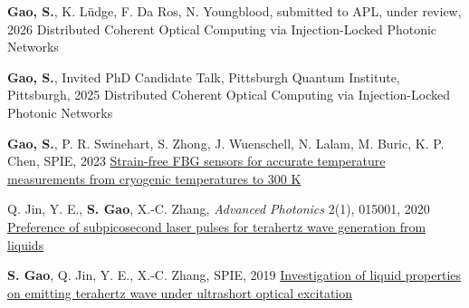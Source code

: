 
\begin{cventries}

  \cventry
    {\textbf{Gao, S.}, K. L\"udge, F. Da Ros, N. Youngblood, submitted to APL, under review, 2026}
    {Distributed Coherent Optical Computing via Injection-Locked Photonic Networks}
    {}{}{}

  \cventry
    {\textbf{Gao, S.}, Invited PhD Candidate Talk, Pittsburgh Quantum Institute, Pittsburgh, 2025}
    {Distributed Coherent Optical Computing via Injection-Locked Photonic Networks}
    {}{}{}

  \cventry
    {\textbf{Gao, S.}, P. R. Swinehart, S. Zhong, J. Wuenschell, N. Lalam, M. Buric, K. P. Chen, SPIE, 2023}
    {\href{https://www.spiedigitallibrary.org/conference-proceedings-of-spie/12532/125320U/Strain-free-FBG-sensors-for-accurate-temperature-measurements-from-cryogenic/10.1117/12.2670079.short}{Strain-free FBG sensors for accurate temperature measurements from cryogenic temperatures to 300 K}}
    {}{}{}

  \cventry
    {Q. Jin, Y. E., \textbf{S. Gao}, X.-C. Zhang, \textit{Advanced Photonics} 2(1), 015001, 2020}
    {\href{https://www.spiedigitallibrary.org/journals/advanced-photonics/volume-2/issue-1/015001/Preference-of-subpicosecond-laser-pulses-for-terahertz-wave-generation-from/10.1117/1.AP.2.1.015001.short}{Preference of subpicosecond laser pulses for terahertz wave generation from liquids}}
    {}{}{}

  \cventry
    {\textbf{S. Gao}, Q. Jin, Y. E., X.-C. Zhang, SPIE, 2019}
    {\href{https://www.spiedigitallibrary.org/conference-proceedings-of-spie/11196/1119609/Investigation-of-liquid-properties-on-emitting-terahertz-wave-under-ultrashort/10.1117/12.2538433.short}{Investigation of liquid properties on emitting terahertz wave under ultrashort optical excitation}}
    {}{}{}

\end{cventries}
